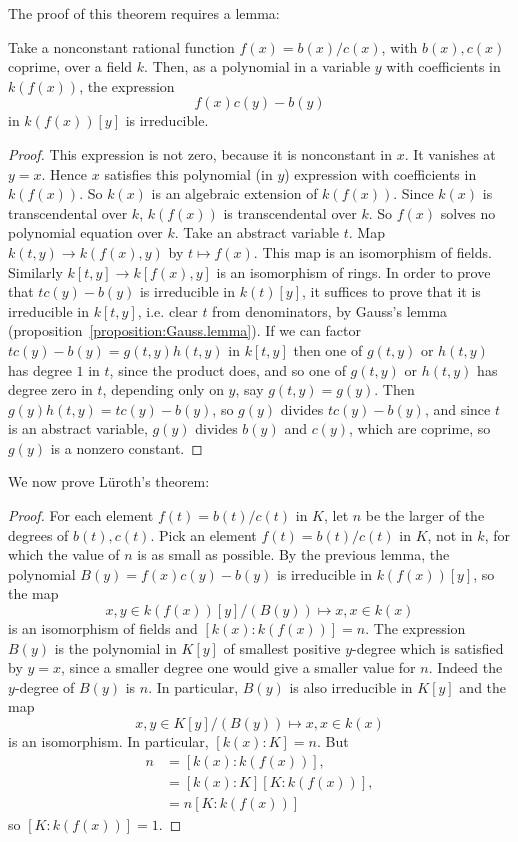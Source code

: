 The proof of this theorem requires a lemma:
\begin{lemma}
Take a nonconstant rational function \(f(x)=b(x)/c(x)\), with \(b(x), c(x)\) coprime, over a field \(k\).
Then, as a polynomial in a variable \(y\) with coefficients in \(k(f(x))\), the expression
\[
f(x)c(y)-b(y) 
\]
in \(k(f(x))[y]\) is irreducible.
\end{lemma}
\begin{proof}
This expression is not zero, because it is nonconstant in \(x\).
It vanishes at \(y=x\).
Hence \(x\) satisfies this polynomial (in \(y\)) expression with coefficients in \(k(f(x))\).
So \(k(x)\) is an algebraic extension of \(k(f(x))\).
Since \(k(x)\) is transcendental over \(k\), \(k(f(x))\) is transcendental over \(k\).
So \(f(x)\) solves no polynomial equation over \(k\).
Take an abstract variable \(t\). 
Map \(k(t,y) \to k(f(x),y)\) by \(t \mapsto f(x)\).
This map is an isomorphism of fields.
Similarly \(k[t,y] \to k[f(x),y]\) is an isomorphism of rings.
In order to prove that \(tc(y)-b(y)\) is irreducible in \(k(t)[y]\), it suffices to prove that it is irreducible in \(k[t,y]\), i.e. clear \(t\) from denominators, by Gauss's lemma (proposition~\vref{proposition:Gauss.lemma}).
If we can factor \(tc(y)-b(y)=g(t,y)h(t,y)\) in \(k[t,y]\) then one of \(g(t,y)\) or \(h(t,y)\) has degree \(1\) in \(t\), since the product does, and so one of \(g(t,y)\) or \(h(t,y)\) has degree zero in \(t\), depending only on \(y\), say \(g(t,y)=g(y)\).
Then \(g(y)h(t,y)=tc(y)-b(y)\), so \(g(y)\) divides \(tc(y)-b(y)\), and since \(t\) is an abstract variable, \(g(y)\) divides \(b(y)\) and \(c(y)\), which are coprime, so \(g(y)\) is a nonzero constant.
\end{proof}
We now prove L\"uroth's theorem:
\begin{proof}
For each element \(f(t)=b(t)/c(t)\) in \(K\), let \(n\) be the  larger of the degrees of \(b(t),c(t)\).
Pick an element \(f(t)=b(t)/c(t)\) in \(K\), not in \(k\), for which the value of \(n\) is as small as possible.
By the previous lemma, the polynomial \(B(y)=f(x)c(y)-b(y)\) is irreducible in \(k(f(x))[y]\), so the map
\[
x,y \in k(f(x))[y]/(B(y)) \mapsto x,x \in k(x)
\]
is an isomorphism of fields and \([k(x):k(f(x))]=n\).
The expression \(B(y)\) is the polynomial in \(K[y]\) of smallest positive \(y\)-degree which is satisfied by \(y=x\), since a smaller degree one would give a smaller value for \(n\).
Indeed the \(y\)-degree of \(B(y)\) is \(n\).
In particular, \(B(y)\) is also irreducible in \(K[y]\) and the map
\[
x,y \in K[y]/(B(y)) \mapsto x,x \in k(x)
\]
is an isomorphism.
In particular, \([k(x):K]=n\).
But
\begin{align*}
n
&=[k(x):k(f(x))],
\\
&=[k(x):K][K:k(f(x))],
\\
&=n[K:k(f(x))]
\end{align*}
so \([K:k(f(x))]=1\).
\end{proof}   